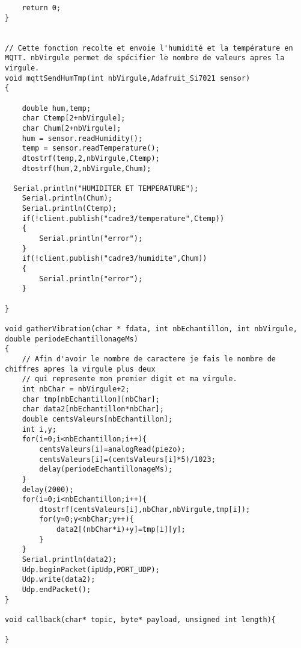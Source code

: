 \begin{scriptsize}
\begin{lstlisting}
	return 0;
}


// Cette fonction recolte et envoie l'humidité et la température en MQTT. nbVirgule permet de spécifier le nombre de valeurs apres la virgule.
void mqttSendHumTmp(int nbVirgule,Adafruit_Si7021 sensor)
{

	double hum,temp;
	char Ctemp[2+nbVirgule];
	char Chum[2+nbVirgule];
	hum = sensor.readHumidity();
	temp = sensor.readTemperature();
	dtostrf(temp,2,nbVirgule,Ctemp);
	dtostrf(hum,2,nbVirgule,Chum);
  
  Serial.println("HUMIDITER ET TEMPERATURE");
	Serial.println(Chum);
	Serial.println(Ctemp);
	if(!client.publish("cadre3/temperature",Ctemp))
	{
		Serial.println("error");
	}
	if(!client.publish("cadre3/humidite",Chum))
	{
		Serial.println("error");
	}

}

void gatherVibration(char * fdata, int nbEchantillon, int nbVirgule, double periodeEchantillonageMs)
{
	// Afin d'avoir le nombre de caractere je fais le nombre de chiffres apres la virgule plus deux
	// qui represente mon premier digit et ma virgule.
	int nbChar = nbVirgule+2;
	char tmp[nbEchantillon][nbChar];
	char data2[nbEchantillon*nbChar];
	double centsValeurs[nbEchantillon];
	int i,y;
	for(i=0;i<nbEchantillon;i++){
		centsValeurs[i]=analogRead(piezo);
		centsValeurs[i]=(centsValeurs[i]*5)/1023;
		delay(periodeEchantillonageMs);
	}
	delay(2000);
	for(i=0;i<nbEchantillon;i++){
		dtostrf(centsValeurs[i],nbChar,nbVirgule,tmp[i]);
		for(y=0;y<nbChar;y++){
			data2[(nbChar*i)+y]=tmp[i][y];
		}	
	}
	Serial.println(data2);
	Udp.beginPacket(ipUdp,PORT_UDP);
	Udp.write(data2);
	Udp.endPacket();
}

void callback(char* topic, byte* payload, unsigned int length){

}
\end{lstlisting}
\end{scriptsize} 
